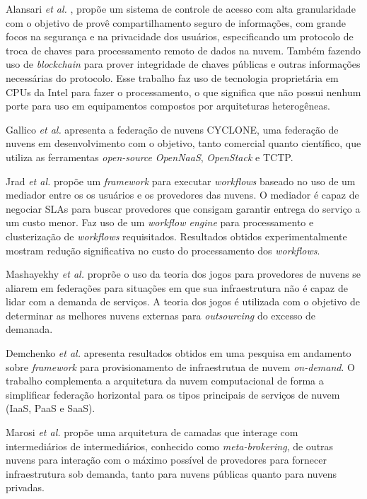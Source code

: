 Alansari \textit{et al.} \cite{ACS_Federation_7980160}, propõe um sistema de controle de acesso com alta granularidade com o objetivo de provê compartilhamento seguro de informações, com grande focos na segurança e na privacidade dos usuários, especificando um protocolo de troca de chaves para processamento remoto de dados na nuvem. Também fazendo uso de \textit{blockchain} para prover integridade de chaves públicas e outras informações necessárias do protocolo. Esse trabalho faz uso de tecnologia proprietária em \acrshort{CPU}s da Intel para fazer o processamento, o que significa que não possui nenhum porte para uso em equipamentos compostos por arquiteturas heterogêneas.

Gallico \textit{et al.} \cite{CYCLONE_7776591} apresenta a federação de nuvens CYCLONE, uma federação de nuvens em desenvolvimento com o objetivo, tanto comercial quanto científico, que utiliza as ferramentas \textit{open-source} \textit{OpenNaaS}\cite{OpenNaaS}, \textit{OpenStack}\cite{OpenStack} e \acrfull{TCTP}\cite{6735419}.

Jrad \textit{et al.} \cite{Jrad:2013:BFM:2462326.2462339} propõe um \textit{framework} para executar \textit{workflows} baseado no uso de um mediador entre os os usuários e os provedores das nuvens. O mediador é capaz de negociar \acrshort{SLA}s para buscar provedores que consigam garantir entrega do serviço a um custo menor. Faz uso de um \textit{workflow engine} para processamento e clusterização de \textit{workflows} requisitados. Resultados obtidos experimentalmente mostram redução significativa no custo do processamento dos \textit{workflows}.

Mashayekhy \textit{et al.} \cite{6853386} proprõe o uso da teoria dos jogos para provedores de nuvens se aliarem em federações para situações em que sua infraestrutura não é capaz de lidar com a demanda de serviços. A teoria dos jogos é utilizada com o objetivo de determinar as melhores nuvens externas para \textit{outsourcing} do excesso de demanada.

Demchenko \textit{et al.} \cite{6427607} apresenta resultados obtidos em uma pesquisa em andamento sobre \textit{framework} para provisionamento de infraestrutua de nuvem \textit{on-demand}. O trabalho complementa a arquitetura da nuvem computacional de forma a simplificar federação horizontal para os tipos principais de serviços de nuvem (\acrshort{IaaS}, \acrshort{PaaS} e \acrshort{SaaS}).

Marosi \textit{et al.} \cite{FCM} propõe uma arquitetura de camadas que interage com intermediários de intermediários, conhecido como \textit{meta-brokering}, de outras nuvens para interação com o máximo possível de provedores para fornecer infraestrutura sob demanda, tanto para nuvens públicas quanto para nuvens privadas.

